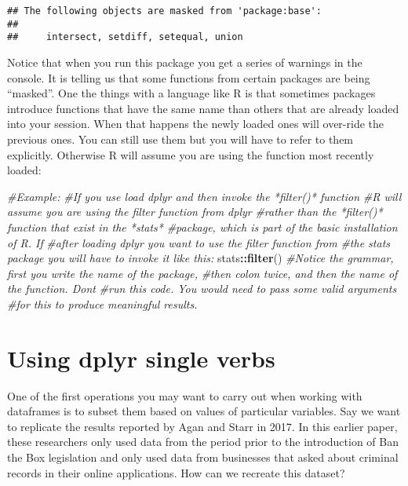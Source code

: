 \documentclass[
]{book}
\newenvironment{Shaded}{\begin{snugshade}}{\end{snugshade}}
\newcommand{\CommentTok}[1]{\textcolor[rgb]{0.56,0.35,0.01}{\textit{#1}}}
\newcommand{\FunctionTok}[1]{\textcolor[rgb]{0.13,0.29,0.53}{\textbf{#1}}}
\newcommand{\NormalTok}[1]{#1}
\newcommand{\SpecialCharTok}[1]{\textcolor[rgb]{0.81,0.36,0.00}{\textbf{#1}}}
\begin{document}
\begin{verbatim}
## The following objects are masked from 'package:base':
## 
##     intersect, setdiff, setequal, union
\end{verbatim}

Notice that when you run this package you get a series of warnings in the console. It is telling us that some functions from certain packages are being ``masked''. One the things with a language like R is that sometimes packages introduce functions that have the same name than others that are already loaded into your session. When that happens the newly loaded ones will over-ride the previous ones. You can still use them but you will have to refer to them explicitly. Otherwise R will assume you are using the function most recently loaded:

\begin{Shaded}
\begin{Highlighting}[]
\CommentTok{\#Example:}
\CommentTok{\#If you use load dplyr and then invoke the *filter()* function}
\CommentTok{\#R will assume you are using the filter function from dplyr}
\CommentTok{\#rather than the *filter()* function that exist in the *stats*}
\CommentTok{\#package, which is part of the basic installation of R. If }
\CommentTok{\#after loading dplyr you want to use the filter function from}
\CommentTok{\#the stats package you will have to invoke it like this:}
\NormalTok{stats}\SpecialCharTok{::}\FunctionTok{filter}\NormalTok{()}
\CommentTok{\#Notice the grammar, first you write the name of the package,}
\CommentTok{\#then colon twice, and then the name of the function. Don\textquotesingle{}t }
\CommentTok{\#run this code. You would need to pass some valid arguments}
\CommentTok{\#for this to produce meaningful results.}
\end{Highlighting}
\end{Shaded}

\section{Using dplyr single verbs}\label{using-dplyr-single-verbs}

One of the first operations you may want to carry out when working with dataframes is to subset them based on values of particular variables. Say we want to replicate the results reported by Agan and Starr in 2017. In this earlier paper, these researchers only used data from the period prior to the introduction of Ban the Box legislation and only used data from businesses that asked about criminal records in their online applications. How can we recreate this dataset?
\end{document}
